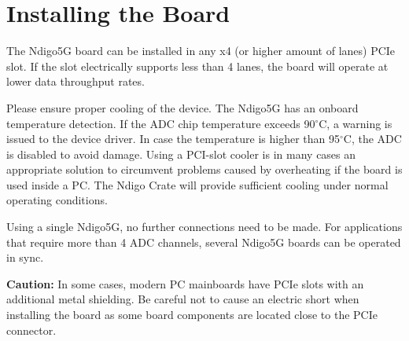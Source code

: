 \section{Installing the Board}
\label{sec:installation}
%
The Ndigo5G board can be installed in any x4 (or higher amount of lanes) PCIe slot. If the slot electrically supports less than 4 lanes, the board will operate at lower data throughput rates.\par
Please ensure proper cooling of the device. The Ndigo5G has an onboard temperature detection. If the ADC chip temperature exceeds 90$^{\circ}$C, a warning is issued to the device driver. In case the temperature is higher than 95$^{\circ}$C, the ADC is disabled to avoid damage. Using a PCI-slot cooler is in many cases an appropriate solution to circumvent problems caused by overheating if the board is used inside a PC. The Ndigo Crate will provide sufficient cooling under normal operating conditions.\par

Using a single Ndigo5G, no further connections need to be made. For applications that require more than 4 ADC channels, several Ndigo5G boards can be operated in sync.\par

\textbf{Caution:} In some cases, modern PC mainboards have PCIe slots with an additional metal shielding. Be careful not to cause an electric short when installing the board as some board components are located close to the PCIe connector. 

